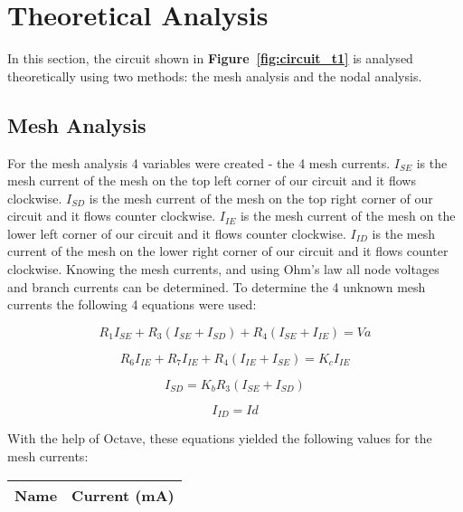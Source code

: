 \section{Theoretical Analysis}
\label{sec:analysis}

In this section, the circuit shown in \textbf{Figure~\ref{fig:circuit_t1}} is analysed
theoretically using two methods: the mesh analysis and the nodal analysis.\par

\subsection{Mesh Analysis} 
For the mesh analysis 4 variables were created - the 4 mesh currents. {\it$I_{SE}$ } is the mesh current of the mesh on the top left corner of our circuit and it flows clockwise. {\it$I_{SD}$} is the mesh current of the mesh on the top right corner of our circuit and it flows counter clockwise. {\it$I_{IE}$ } is the mesh current of the mesh on the lower left corner of our circuit and it flows counter clockwise. {\it$I_{ID}$} is the mesh current of the mesh on the lower right corner of our circuit and it flows counter clockwise. Knowing the mesh currents, and using Ohm's law all node voltages and branch currents can be determined. To determine the 4 unknown mesh currents the following 4 equations were used:


\begin {equation}
	R_1I_{SE} + R_3(I_{SE}+I_{SD}) + R_4(I_{SE}+I_{IE}) = Va
	\label{eq:m1}
\end{equation}

\begin {equation}
	R_6I_{IE} + R_7I_{IE} + R_4(I_{IE}+I_{SE}) = K_cI_{IE}
	\label{eq:m2}
\end{equation}

\begin {equation}
	I_{SD} = K_bR_3(I_{SE}+I_{SD})
	\label{eq:m3}
\end{equation}

\begin {equation}
	I_{ID} = Id
	\label{eq:m4}
\end{equation}

With the help of Octave, these equations yielded the following values for the mesh currents:\par

\begin{table}[h]
  \centering
  \begin{tabular}{|l|r|}
    \hline    
    {\bf Name} & {\bf Current (mA)}\\ \hline
    
  \end{tabular}
  \label{tab:theoretical_curr}
\end{table}

